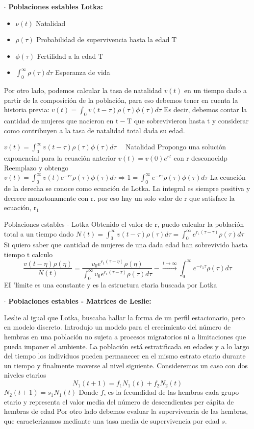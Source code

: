 \documentclass[%
 reprint,
 amsmath,amssymb,
 aps,
]{revtex4-1}
\begin{document}
\textbf{$\cdot$ Poblaciones estables Lotka:}


\begin{itemize}
  \item[] $\nu(t)$ Natalidad
  \item[] $\rho(\tau)$ Probabilidad de supervivencia hasta la edad $\mathrm{T}$
  \item[] $\phi(\tau)$ Fertilidad a la edad $\mathrm{T}$
  \item[] $\int_{0}^{\infty} \rho(\tau) d \tau$ Esperanza de vida
\end{itemize}


Por otro lado, podemos calcular la tasa de natalidad $v(t)$ en un tiempo dado a partir de la composición de la población, para eso debemos tener en cuenta la historia previa:
$v(t)=\int_{0} v(t-\tau) \rho(\tau) \phi(\tau) d \tau$
Es decir, debemos contar la cantidad de mujeres que nacieron en $\mathrm{t}-\mathrm{T}$ que sobrevivieron hasta t y considerar como contribuyen a la tasa de natalidad total dada su edad.


$v(t)=\int_{0}^{\infty} v(t-\tau) \rho(\tau) \phi(\tau) d \tau \quad$ Natalidad
Propongo una solución exponencial para la ecuación anterior $v(t)=v(0) e^{r t}$
con $\mathrm{r}$ desconocidp
Reemplazo y obtengo
$v(t)=\int_{0}^{\infty} v(t) e^{-r \tau} \rho(\tau) \phi(\tau) d \tau \Rightarrow 1=\int_{0}^{\infty} e^{-r \tau} \rho(\tau) \phi(\tau) d \tau$
La ecuación de la derecha se conoce como ecuación de Lotka. La integral es siempre positiva y decrece monotonamente con $\mathrm{r}$. por eso hay un solo valor de $\mathrm{r}$ que satisface la ecuación, $\mathrm{r}_{1}$

Poblaciones estables - Lotka
Obtenido el valor de r, puedo calcular la población total a un tiempo dado
$N(t)=\int_{0}^{\infty} v(t-\tau) \rho(\tau) d \tau=\int_{0}^{\infty} e^{r_{1}(\tau-\tau)} \rho(\tau) d \tau$
Si quiero saber que cantidad de mujeres de una dada edad han sobrevivido hasta tiempo t calculo
$$
\frac{v(t-\eta) \rho(\eta)}{N(t)}=\frac{v_{0} e^{r_{1}(\tau-\eta)} \rho(\eta)}{\int_{0}^{\infty} v_{0} e^{r_{1}(\tau-\tau)} \rho(\tau) d \tau}-\stackrel{t \rightarrow \infty}{\rightarrow} \int_{0}^{\infty} e^{-r_{1} \tau} \rho(\tau) d \tau
$$
EI 'límite es una constante y es la estructura etaria buscada por Lotka

\textbf{$\cdot$ Poblaciones estables - Matrices de Leslie:}


Leslie al igual que Lotka, buscaba hallar la forma de un perfil estacionario, pero en modelo discreto. Introdujo un modelo para el crecimiento del número de hembras en una población no sujeta a procesos migratorios ni a limitaciones que pueda imponer el ambiente. La población está estratificada en edades y a lo largo del tiempo los individuos pueden permanecer en el mismo estrato etario durante un tiempo y finalmente moverse al nivel siguiente. Consideremos un caso con dos niveles etarios
$$
N_{1}(t+1)=f_{1} N_{1}(t)+f_{2} N_{2}(t)
$$
$N_{2}(t+1)=s_{1} N_{1}(t)$
Donde $f$, es la fecundidad de las hembras cada grupo etario y representa el valor media del número de descendientes per cápita de hembras de edad Por otro lado debemos evaluar la supervivencia de las hembras, que caracterizamos mediante una tasa media de supervivencia por edad $s$.
\end{document}
